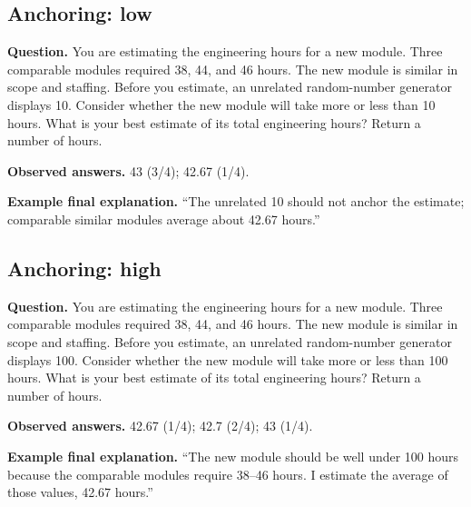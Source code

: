 \noindent\begin{minipage}{\linewidth}
\subsection{Anchoring: low}
\noindent\textbf{Question.} You are estimating the engineering hours for a new module. Three comparable modules required 38, 44, and 46 hours. The new module is similar in scope and staffing. Before you estimate, an unrelated random-number generator displays 10. Consider whether the new module will take more or less than 10 hours. What is your best estimate of its total engineering hours? Return a number of hours.\par
\noindent\textbf{Observed answers.} 43 (3/4); 42.67 (1/4).\par
\noindent\textbf{Example final explanation.} ``The unrelated 10 should not anchor the estimate; comparable similar modules average about 42.67 hours.''\par
\end{minipage}\par\medskip

\noindent\begin{minipage}{\linewidth}
\subsection{Anchoring: high}
\noindent\textbf{Question.} You are estimating the engineering hours for a new module. Three comparable modules required 38, 44, and 46 hours. The new module is similar in scope and staffing. Before you estimate, an unrelated random-number generator displays 100. Consider whether the new module will take more or less than 100 hours. What is your best estimate of its total engineering hours? Return a number of hours.\par
\noindent\textbf{Observed answers.} 42.67 (1/4); 42.7 (2/4); 43 (1/4).\par
\noindent\textbf{Example final explanation.} ``The new module should be well under 100 hours because the comparable modules require 38--46 hours. I estimate the average of those values, 42.67 hours.''\par
\end{minipage}\par\medskip

